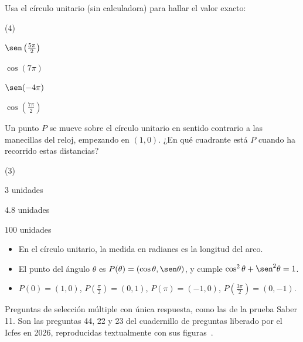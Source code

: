\documentclass[11pt]{article}
\begin{document}
\begin{preguntas}
\pregunta Usa el círculo unitario (sin calculadora) para hallar el valor exacto:
\begin{opciones*}(4)
  \item $\sen\left(\frac{5\pi}{2}\right)$
  \item $\cos(7\pi)$
  \item $\sen(-4\pi)$
  \item $\cos\left(\frac{7\pi}{2}\right)$
\end{opciones*}
\espacio{2cm}
\pregunta Un punto $P$ se mueve sobre el círculo unitario en sentido contrario a
las manecillas del reloj, empezando en $(1, 0)$. ¿En qué cuadrante está $P$ cuando
ha recorrido estas distancias?
\begin{opciones*}(3)
  \item $3$ unidades
  \item $\num{4,8}$ unidades
  \item $100$ unidades
\end{opciones*}
\espacio{2.5cm}
\end{preguntas}

\begin{resumen}
\begin{itemize}
  \item En el círculo unitario, la medida en radianes es la longitud del arco.
  \item El punto del ángulo $\theta$ es $P(\theta) = (\cos\theta, \sen\theta)$, y cumple $\cos^2\theta + \sen^2\theta = 1$.
  \item $P(0) = (1, 0)$, $P(\frac{\pi}{2}) = (0, 1)$, $P(\pi) = (-1, 0)$, $P(\frac{3\pi}{2}) = (0, -1)$.
\end{itemize}
\end{resumen}


\begin{instrucciones}
Preguntas de selección múltiple con única respuesta, como las de la prueba
Saber 11. Son las preguntas 44, 22 y 23 del cuadernillo de preguntas liberado
por el Icfes en 2026, reproducidas textualmente con sus figuras~\cite{icfes2026}.
\end{instrucciones}
\end{document}
